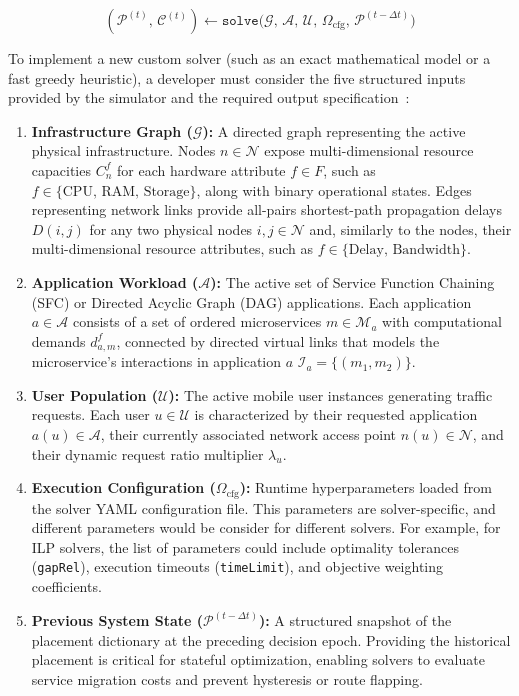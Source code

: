 \documentclass[ASNA]{USG} %
\begin{document}
\begin{equation}
(\mathcal{P}^{(t)}, \, \mathcal{C}^{(t)}) \leftarrow \texttt{solve}\Big(\mathcal{G}, \, \mathcal{A}, \, \mathcal{U}, \, \Omega_{\text{cfg}}, \, \mathcal{P}^{(t-\Delta t)}\Big)
\end{equation}

To implement a new custom solver (such as an exact mathematical model or a fast greedy heuristic), a developer must consider the five structured inputs provided by the simulator and the required output specification~\cite{Santos2021Service}:

\begin{enumerate}
    \item \textbf{Infrastructure Graph ($\mathcal{G}$):} A directed graph representing the active physical infrastructure. Nodes $n \in \mathcal{N}$ expose multi-dimensional resource capacities $C_n^f$ for each hardware attribute $f \in F$, such as $f \in \{\text{CPU, RAM, Storage}\}$, along with binary operational states. Edges representing network links provide all-pairs shortest-path propagation delays $D(i, j)$ for any two physical nodes $i, j \in \mathcal{N}$ and, similarly to the nodes, their multi-dimensional resource attributes, such as $f \in \{\text{Delay, Bandwidth}\}$.
    \item \textbf{Application Workload ($\mathcal{A}$):} The active set of Service Function Chaining (SFC) or Directed Acyclic Graph (DAG) applications. Each application $a \in \mathcal{A}$ consists of a set of ordered microservices $m \in \mathcal{M}_a$ with computational demands $d_{a,m}^f$, connected by directed virtual links that models the microservice's interactions in application $a$ $\mathcal{I}_a = \{(m_1, m_2)\}$.
    \item \textbf{User Population ($\mathcal{U}$):} The active mobile user instances generating traffic requests. Each user $u \in \mathcal{U}$ is characterized by their requested application $a(u) \in \mathcal{A}$, their currently associated network access point $n(u) \in \mathcal{N}$, and their dynamic request ratio multiplier $\lambda_u$.
    \item \textbf{Execution Configuration ($\Omega_{\text{cfg}}$):} Runtime hyperparameters loaded from the solver YAML configuration file. This parameters are solver-specific, and different parameters would be consider for different solvers. For example, for ILP solvers, the list of parameters could include optimality tolerances (\texttt{gapRel}), execution timeouts (\texttt{timeLimit}), and objective weighting coefficients.
    \item \textbf{Previous System State ($\mathcal{P}^{(t-\Delta t)}$):} A structured snapshot of the placement dictionary at the preceding decision epoch. Providing the historical placement is critical for stateful optimization, enabling solvers to evaluate service migration costs and prevent hysteresis or route flapping.
\end{enumerate}
\end{document}
